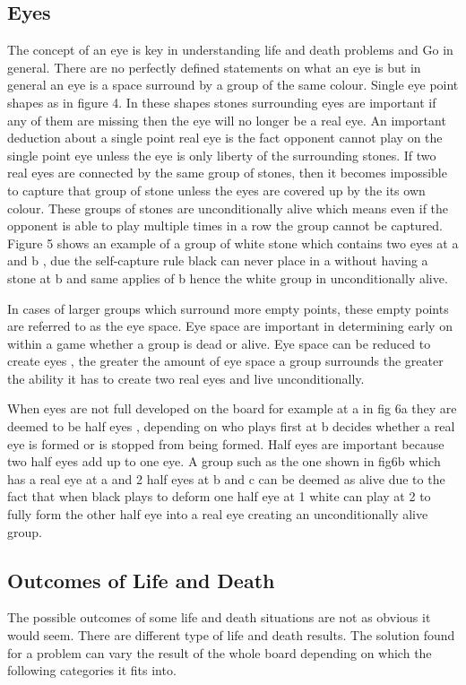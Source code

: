 \documentclass{l4proj}
\begin{document}
\subsection{Eyes}
The concept of an eye is key in understanding life and death problems and Go in general. There are no perfectly defined statements on what an eye is but in general an eye is a space surround by a group of the same colour. Single eye point shapes as in figure 4. In these shapes stones surrounding eyes are important if any of them are missing then the eye will no longer be a real eye. An important deduction about a single point real eye is the fact opponent cannot play on the single point eye unless the eye is only liberty of the surrounding stones. If two real eyes are connected by the same group of stones, then it becomes impossible to capture that group of stone unless the eyes are covered up by the its own colour. These groups of stones are unconditionally alive which means even if the opponent is  able to play multiple times in a row the group cannot be captured. Figure 5 shows an example of a group of white stone which contains two eyes at a and b , due the self-capture rule black can never place in a without having a stone at b and same applies of b hence the white group in unconditionally alive.

In cases of larger groups which surround more empty points, these empty points are referred to as the eye space. Eye space are important in determining early on within a game whether a group is dead or alive. Eye space can be reduced to create eyes , the greater the amount of eye space a group surrounds the greater the ability it has to create two real eyes and live unconditionally.

When eyes are not full developed on the board for example at a in fig 6a they are deemed to be half eyes , depending on who plays first at b decides whether a real eye is formed or is stopped from being formed. Half eyes are important because two half eyes add up to one eye.  A group such as the one shown in fig6b which has a real eye at a and 2 half eyes at b and c can be deemed as alive due to the fact that when black plays to deform one half eye at 1 white can play at 2 to fully form the other half eye into a real eye creating an unconditionally alive group.


\subsection{Outcomes of Life and Death}
The possible outcomes of some life and death situations are not as obvious it would seem. There are different type of life and death results. The solution found for a problem can vary the result of the whole board depending on which the following categories it fits into.
\end{document}
